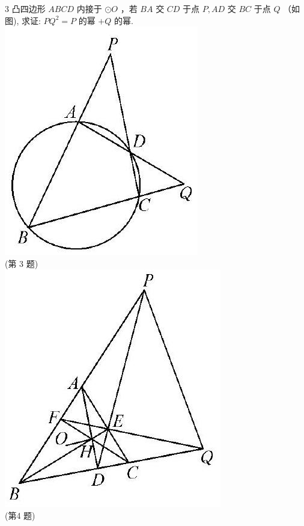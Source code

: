 \documentclass[10pt]{article}
\begin{document}
3 凸四边形 $A B C D$ 内接于 $\odot O$ ，若 $B A$ 交 $C D$ 于点 $P, A D$ 交 $B C$ 于点 $Q$ （如图), 求证: $P Q^{2}=P$ 的幂 $+Q$ 的幂.\\
\includegraphics[max width=\textwidth, center]{2024_10_30_66b8e5e701da2093c133g-063(2)}\\
(第 3 题)\\
\includegraphics[max width=\textwidth, center]{2024_10_30_66b8e5e701da2093c133g-063}\\
(第4 题)
\end{document}

